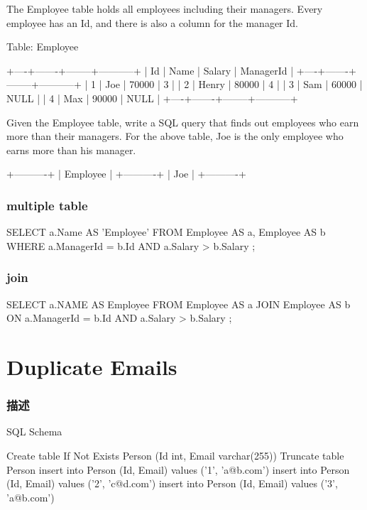 The Employee table holds all employees including their managers. Every employee has an Id, and there is also a column for the manager Id.

Table: Employee
\begin{Code}
+----+-------+--------+-----------+
| Id | Name  | Salary | ManagerId |
+----+-------+--------+-----------+
| 1  | Joe   | 70000  | 3         |
| 2  | Henry | 80000  | 4         |
| 3  | Sam   | 60000  | NULL      |
| 4  | Max   | 90000  | NULL      |
+----+-------+--------+-----------+
\end{Code}

Given the Employee table, write a SQL query that finds out employees who earn more than their managers. For the above table, Joe is the only employee who earns more than his manager.

\begin{Code}
+----------+
| Employee |
+----------+
| Joe      |
+----------+
\end{Code}


\subsubsection{multiple table}
\begin{Code}
SELECT
    a.Name AS 'Employee'
FROM
    Employee AS a,
    Employee AS b
WHERE
    a.ManagerId = b.Id
        AND a.Salary > b.Salary
;
\end{Code}

\subsubsection{join}
\begin{Code}
SELECT
     a.NAME AS Employee
FROM Employee AS a JOIN Employee AS b
     ON a.ManagerId = b.Id
     AND a.Salary > b.Salary
;
\end{Code}

\section{Duplicate Emails} %
\label{sec:duplicate-emails}


\subsubsection{描述}
SQL Schema

\begin{Code}
Create table If Not Exists Person (Id int, Email varchar(255))
Truncate table Person
insert into Person (Id, Email) values ('1', 'a@b.com')
insert into Person (Id, Email) values ('2', 'c@d.com')
insert into Person (Id, Email) values ('3', 'a@b.com')
\end{Code}

